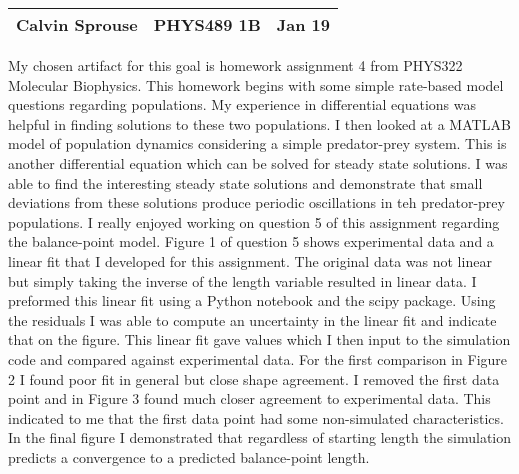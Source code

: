 \documentclass[a4paper, 12pt]{config/homework}
\begin{document}
\noindent
\begin{tabularx}{\textwidth}{>{\centering\arraybackslash}X>{\centering\arraybackslash}X>{\centering\arraybackslash}X}
Calvin Sprouse & PHYS489 1B & 2024 Jan 19\\
\midrule
\end{tabularx}


My chosen artifact for this goal is homework assignment 4 from PHYS322 Molecular Biophysics. This homework begins with some simple rate-based model questions regarding populations. My experience in differential equations was helpful in finding solutions to these two populations. I then looked at a MATLAB model of population dynamics considering a simple predator-prey system. This is another differential equation which can be solved for steady state solutions. I was able to find the interesting steady state solutions and demonstrate that small deviations from these solutions produce periodic oscillations in teh predator-prey populations. I really enjoyed working on question 5 of this assignment regarding the balance-point model. Figure 1 of question 5 shows experimental data and a linear fit that I developed for this assignment. The original data was not linear but simply taking the inverse of the length variable resulted in linear data. I preformed this linear fit using a Python notebook and the scipy package. Using the residuals I was able to compute an uncertainty in the linear fit and indicate that on the figure. This linear fit gave values which I then input to the simulation code and compared against experimental data. For the first comparison in Figure 2 I found poor fit in general but close shape agreement. I removed the first data point and in Figure 3 found much closer agreement to experimental data. This indicated to me that the first data point had some non-simulated characteristics. In the final figure I demonstrated that regardless of starting length the simulation predicts a convergence to a predicted balance-point length.


\end{document}
